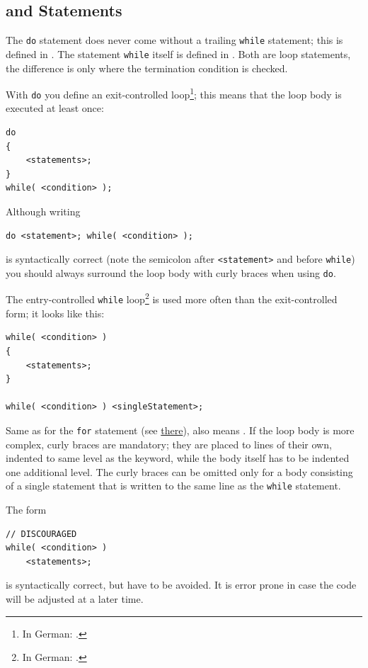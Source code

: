\subsection{ and  Statements}\label{sec:WhileStatements}
The \lstinline|do| statement does never come without a trailing \lstinline|while| statement; this is defined in \autocite{ORACLE_DOC_LANGUAGE_SPECIFICATION:WhileDo}. The statement \lstinline|while| itself is defined in \autocite{ORACLE_DOC_LANGUAGE_SPECIFICATION:While}. Both are loop statements, the difference is only where the termination condition is checked.

With \lstinline|do| you define an exit-controlled loop\footnote{In German: .}; this means that the loop body is executed at least once:
\begin{lstlisting}
do
{
    <statements>;
}
while( <condition> );
\end{lstlisting}

Although writing
\begin{lstlisting}
do <statement>; while( <condition> );
\end{lstlisting}
is syntactically correct (note the semicolon after \verb#<statement># and before \lstinline|while|) you should always surround the loop body with curly braces when using \lstinline|do|.

The entry-controlled \lstinline|while| loop\footnote{In German: .} is used more often than the exit-controlled form; it looks like this:
\begin{lstlisting}
while( <condition> )
{
    <statements>;
}

while( <condition> ) <singleStatement>;
\end{lstlisting}

Same as for the \lstinline|for| statement (see \hyperref[sec:ForStatements]{there}),  also means . If the loop body is more complex, curly braces are mandatory; they are placed to lines of their own, indented to same level as the keyword, while the body itself has to be indented one additional level. The curly braces can be omitted only for a body consisting of a single statement that is written to the same line as the \lstinline|while| statement.

The form
\begin{lstlisting}
// DISCOURAGED
while( <condition> )
    <statements>;
\end{lstlisting}
is syntactically correct, but have to be avoided. It is error prone in case the code will be adjusted at a later time.

